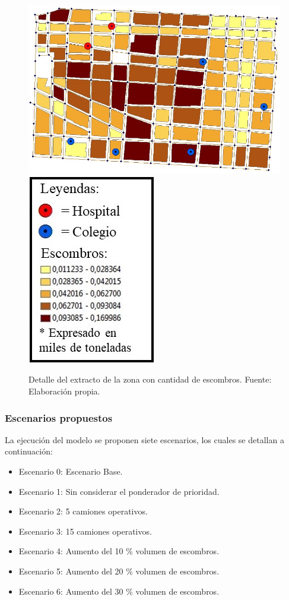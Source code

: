 \documentclass[letterpaper,conference]{IEEEtran}
\begin{document}
\begin{figure}[h!]
	\centering
	\includegraphics[scale=0.4]{Figuras/mapa1.jpg}
	\includegraphics[scale=0.5]{Figuras/simb3.jpg} 
	\caption{Detalle del extracto de la zona con cantidad de escombros. Fuente: Elaboración propia.}
	\label{fig:fig5}
\end{figure}

\pagebreak

\subsubsection{Escenarios propuestos}

La ejecución del modelo se proponen siete escenarios, los cuales se detallan a continuación:

\begin{itemize}
	\item Escenario 0: Escenario Base.
	\item Escenario 1: Sin considerar el ponderador de prioridad.
	\item Escenario 2: 5 camiones operativos.
	\item Escenario 3: 15 camiones operativos.
	\item Escenario 4: Aumento del 10 \% volumen de escombros.
	\item Escenario 5: Aumento del 20 \% volumen de escombros.
	\item Escenario 6: Aumento del 30 \% volumen de escombros.
\end{itemize}
\end{document}
